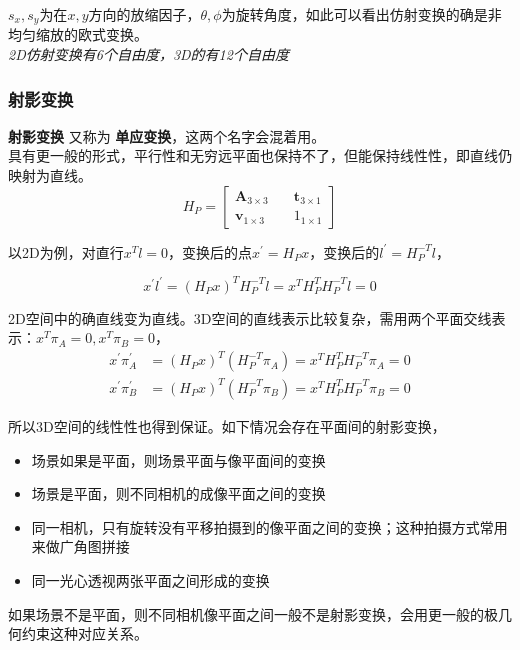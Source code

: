 \documentclass[hpyerref,UTF8,a4paper,titlepage,12pt,oneside]{ctexbook}
\theoremstyle{definition}
\begin{document}
		$s_x,s_y$为在$x,y$方向的放缩因子，$\theta,\phi$为旋转角度，如此可以看出仿射变换的确是非均匀缩放的欧式变换。\\

		\textit{2D仿射变换有6个自由度，3D的有12个自由度}
	
	\subsubsection{射影变换}

		\textbf{射影变换} 又称为 \textbf{单应变换}，这两个名字会混着用。\\

		具有更一般的形式，平行性和无穷远平面也保持不了，但能保持线性性，即直线仍映射为直线。
		$$
			H_P = \begin{bmatrix}
				\mathbf{A}_{3\times 3}\quad& \mathbf{t}_{3\times 1}\\
				\mathbf{v}_{1\times 3} \quad& 1_{1\times 1}
			\end{bmatrix}
		$$

		以2D为例，对直行$x^Tl = 0$，变换后的点$x^\prime = H_Px$，变换后的$l^\prime = H_P^{-T}l$，

		$$
			x^\prime l^\prime = \left(H_Px\right)^TH_P^{-T}l = x^T H_P^TH_P^{-T}l = 0
		$$

		2D空间中的确直线变为直线。3D空间的直线表示比较复杂，需用两个平面交线表示：$x^T\pi_A =0,  x^T\pi_B =0$，
		\begin{align*}		
			x^\prime \pi_A^{\prime} &= (H_Px)^T(H_P^{-T}\pi_A) = x^TH_P^TH_P^{-T}\pi_A = 0\\
			x^\prime \pi_B^{\prime} &= (H_Px)^T(H_P^{-T}\pi_B) = x^TH_P^TH_P^{-T}\pi_B = 0
		\end{align*}

		所以3D空间的线性性也得到保证。如下情况会存在平面间的射影变换，

		\begin{itemize}
			\item 场景如果是平面，则场景平面与像平面间的变换
			\item 场景是平面，则不同相机的成像平面之间的变换
			\item 同一相机，只有旋转没有平移拍摄到的像平面之间的变换；这种拍摄方式常用来做广角图拼接
			\item 同一光心透视两张平面之间形成的变换
		\end{itemize}

		如果场景不是平面，则不同相机像平面之间一般不是射影变换，会用更一般的极几何约束这种对应关系。\\
\end{document}

